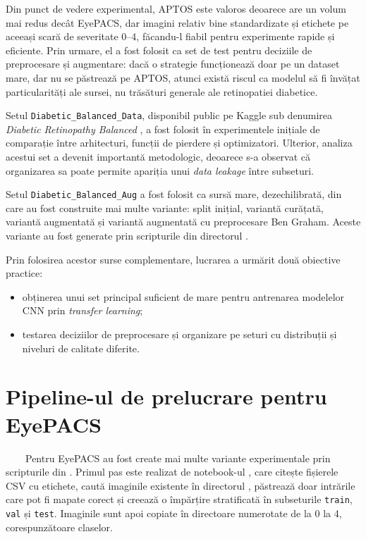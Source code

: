 \documentclass[12pt, a4paper, twoside, romanian]{teza-upb}
\begin{document}
Din punct de vedere experimental, APTOS este valoros deoarece are un volum mai redus decât
EyePACS, dar imagini relativ bine standardizate și etichete pe aceeași scară de severitate
0--4, făcandu-l fiabil pentru experimente rapide și eficiente. Prin urmare, el a fost folosit 
ca set de test pentru deciziile de preprocesare și augmentare: dacă o strategie funcționează 
doar pe un dataset mare, dar nu se păstrează pe APTOS, atunci există riscul ca modelul să fi 
învățat particularități ale sursei, nu trăsături generale ale retinopatiei diabetice.
\bigskip

Setul \texttt{Diabetic\_Balanced\_Data}, disponibil public pe Kaggle sub denumirea
\textit{Diabetic Retinopathy Balanced} \cite{24_kaggle_diabetic_balanced}, a fost folosit în
experimentele inițiale de comparație între arhitecturi, funcții de pierdere și optimizatori.
Ulterior, analiza acestui set a devenit importantă metodologic, deoarece s-a observat că
organizarea sa poate permite apariția unui \textit{data leakage} între subseturi. 
\bigskip

Setul \texttt{Diabetic\_Balanced\_Aug} a fost folosit ca sursă mare, dezechilibrată, din care au
fost construite mai multe variante: split inițial, variantă curățată, variantă augmentată și
variantă augmentată cu preprocesare Ben Graham. Aceste variante au fost generate prin
scripturile din directorul .
\bigskip

Prin folosirea acestor surse complementare, lucrarea a urmărit două obiective practice:

\begin{itemize}
  \item obținerea unui set principal suficient de mare pentru antrenarea modelelor CNN prin \textit{transfer learning};
  \item testarea deciziilor de preprocesare și organizare pe seturi cu distribuții și niveluri de calitate diferite.
\end{itemize}

\section{Pipeline-ul de prelucrare pentru EyePACS}

\ \ \ \ Pentru EyePACS au fost create mai multe variante experimentale prin scripturile din
. Primul pas este realizat de notebook-ul ,
care citește fișierele CSV cu etichete, caută imaginile existente în directorul
, păstrează doar intrările care pot fi mapate corect și creează o împărțire
stratificată în subseturile \texttt{train}, \texttt{val} și \texttt{test}. Imaginile sunt apoi
copiate în directoare numerotate de la 0 la 4, corespunzătoare claselor.
\bigskip
\end{document}
